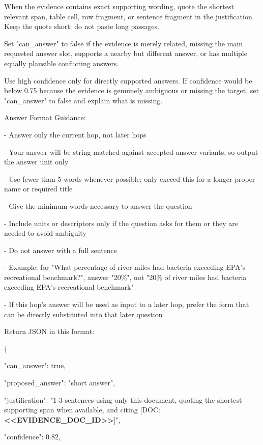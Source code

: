 \begin{tcolorbox}
\begin{scriptsize}
When the evidence contains exact supporting wording, quote the shortest relevant span, table cell, row fragment, or sentence fragment in the justification. Keep the quote short; do not paste long passages.\par
Set "can\_answer" to false if the evidence is merely related, missing the main requested answer slot, supports a nearby but different answer, or has multiple equally plausible conflicting answers.\par
Use high confidence only for directly supported answers. If confidence would be below 0.75 because the evidence is genuinely ambiguous or missing the target, set "can\_answer" to false and explain what is missing.\par
\mbox{}\par
Answer Format Guidance:\par
- Answer only the current hop, not later hops\par
- Your answer will be string-matched against accepted answer variants, so output the answer unit only\par
- Use fewer than 5 words whenever possible; only exceed this for a longer proper name or required title\par
- Give the minimum words necessary to answer the question\par
- Include units or descriptors only if the question asks for them or they are needed to avoid ambiguity\par
- Do not answer with a full sentence\par
- Example: for "What percentage of river miles had bacteria exceeding EPA's recreational benchmark?", answer "20\%", not "20\% of river miles had bacteria exceeding EPA's recreational benchmark"\par
- If this hop's answer will be used as input to a later hop, prefer the form that can be directly substituted into that later question\par
\mbox{}\par
Return JSON in this format:\par
\{\par
  "can\_answer": true,\par
  "proposed\_answer": "short answer",\par
  "justification": "1-3 sentences using only this document, quoting the shortest supporting span when available, and citing [DOC:\textcolor{my-green}{\textbf{\textless{}\textless{}EVIDENCE\_DOC\_ID\textgreater{}\textgreater{}}}]",\par
  "confidence": 0.82,\par

\end{scriptsize}
\end{tcolorbox}
